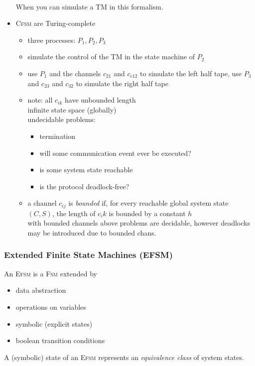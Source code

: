 \documentclass[a4paper, 10pt]{article}
\begin{document}
\begin{itemize}
    \\ When you can simulate a TM in this formalism.
    \item \textsc{Cfsm} are Turing-complete
    \begin{itemize}
        \item three processes: $P_1,P_2,P_3$
        \item simulate the control of the TM in the state machine of $P_2$
        \item use $P_1$ and the channels $c_{21}$ and $c_{c12}$ to simulate the left half tape, use $P_3$ and $c_{23}$ and $c_{32}$ to simulate the right half tape
        \item note: all $c_{ik}$ have unbounded length
        \\ \follows infinite state space (globally)
        \\ \follows undecidable problems:
        \begin{itemize}
            \item termination
            \item will some communication event ever be executed?
            \item is some system state reachable
            \item is the protocol deadlock-free?
        \end{itemize}
        \item a channel $c_{ij}$ is \emph{bounded} if, for every reachable global system state $(C,S)$, the length of $c_ik$ is bounded by a constant $h$
        \\ with bounded channels above problems are decidable, however deadlocks may be introduced due to bounded chans.
    \end{itemize}
\end{itemize}

\subsubsection*{Extended Finite State Machines (EFSM)}
An \textsc{Efsm} is a \textsc{Fsm} extended by
\begin{itemize}
    \item data abstraction
    \item operations on variables
    \item symbolic (explicit states)
    \item boolean transition conditions
\end{itemize}
A (symbolic) state of an \textsc{Efsm} represents an \emph{equivalence class} of system states.
\end{document}

